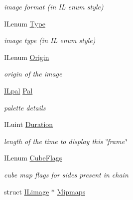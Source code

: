 \begin{DoxyCompactItemize}
\begin{DoxyCompactList}\small\item\em image format (in I\+L enum style) \end{DoxyCompactList}\item 
\hypertarget{struct_i_limage_af84630dff97fdc18dcf1c8187f5e1918}{I\+Lenum \hyperlink{struct_i_limage_af84630dff97fdc18dcf1c8187f5e1918}{Type}}\label{struct_i_limage_af84630dff97fdc18dcf1c8187f5e1918}

\begin{DoxyCompactList}\small\item\em image type (in I\+L enum style) \end{DoxyCompactList}\item 
\hypertarget{struct_i_limage_ac2bc011c3f8a65eea30a8d4495c96a2e}{I\+Lenum \hyperlink{struct_i_limage_ac2bc011c3f8a65eea30a8d4495c96a2e}{Origin}}\label{struct_i_limage_ac2bc011c3f8a65eea30a8d4495c96a2e}

\begin{DoxyCompactList}\small\item\em origin of the image \end{DoxyCompactList}\item 
\hypertarget{struct_i_limage_a1e17c6b3c912a9bcddb50dd7a61011a7}{\hyperlink{struct_i_lpal}{I\+Lpal} \hyperlink{struct_i_limage_a1e17c6b3c912a9bcddb50dd7a61011a7}{Pal}}\label{struct_i_limage_a1e17c6b3c912a9bcddb50dd7a61011a7}

\begin{DoxyCompactList}\small\item\em palette details \end{DoxyCompactList}\item 
\hypertarget{struct_i_limage_afde5827e053680ff1e81a9a9c0832042}{I\+Luint \hyperlink{struct_i_limage_afde5827e053680ff1e81a9a9c0832042}{Duration}}\label{struct_i_limage_afde5827e053680ff1e81a9a9c0832042}

\begin{DoxyCompactList}\small\item\em length of the time to display this \char`\"{}frame\char`\"{} \end{DoxyCompactList}\item 
\hypertarget{struct_i_limage_a20bd452e1573aa08c7d9687190cbfa89}{I\+Lenum \hyperlink{struct_i_limage_a20bd452e1573aa08c7d9687190cbfa89}{Cube\+Flags}}\label{struct_i_limage_a20bd452e1573aa08c7d9687190cbfa89}

\begin{DoxyCompactList}\small\item\em cube map flags for sides present in chain \end{DoxyCompactList}\item 
\hypertarget{struct_i_limage_afa2c8bedcd1178760327302911969035}{struct \hyperlink{struct_i_limage}{I\+Limage} $\ast$ \hyperlink{struct_i_limage_afa2c8bedcd1178760327302911969035}{Mipmaps}}\label{struct_i_limage_afa2c8bedcd1178760327302911969035}


\end{DoxyCompactItemize}
